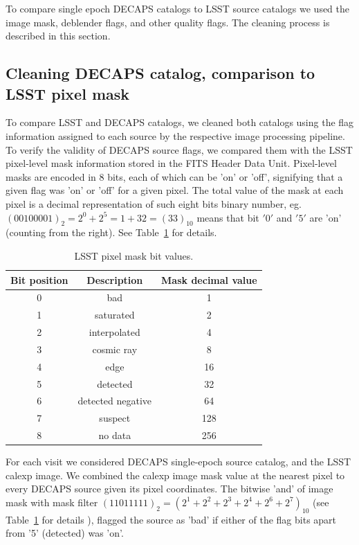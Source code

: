 \documentclass[DM,lsstdraft,toc,usenatbib]{lsstdoc}
\begin{document}
To compare single epoch DECAPS catalogs to LSST source catalogs we used the image mask, deblender flags, and other quality flags. The cleaning process is described in this section. 


\subsection{Cleaning DECAPS catalog, comparison to LSST pixel mask}
\label{sec:clean_decaps}
To compare LSST and DECAPS catalogs, we cleaned both catalogs using the flag information assigned to each source by the respective image processing pipeline. To verify the validity of DECAPS source flags, we compared them with the LSST pixel-level mask information stored in the FITS Header Data Unit. Pixel-level masks are encoded in 8 bits,  each of which can be 'on' or 'off', signifying that a given flag was 'on' or 'off' for a given pixel. The total value of the mask at each pixel is a decimal representation of such eight bits binary number, eg.  $(00100001)_{2} = 2^{0} + 2^{5}  = 1 + 32 = (33)_{10} $ means that bit $'0'$ and $'5'$ are 'on' (counting from the right). See Table~\ref{tab:lsst_flags} for details. 


\begin{table}
\centering
\caption{LSST pixel mask bit values.}
\label{tab:lsst_flags}
\begin{tabular}{ ccc} 
\hline
Bit position & Description & Mask decimal value  \\ 
\hline
0  & bad               & 1    \\ 
1  & saturated         & 2   \\ 
2  & interpolated      & 4    \\ 
3  & cosmic ray        & 8    \\ 
4  & edge              & 16    \\ 
5  & detected          & 32   \\ 
6  & detected negative & 64   \\ 
7  & suspect           & 128   \\ 
8  & no data           & 256     \\ 
\hline
\end{tabular}
\end{table}

For each  visit we considered DECAPS single-epoch source catalog, and the LSST calexp image. We combined the calexp image mask value at the nearest pixel to every DECAPS source given its pixel coordinates.  The bitwise 'and' of image mask with mask filter $(11011111)_{2} = (2^{1}+2^{2}+2^{3}+2^{4}+2^{6}+2^{7})_{10}$ (see Table~\ref{tab:lsst_flags} for details ), flagged the source   as 'bad' if either of the flag bits apart from '5' (detected) was 'on'. 
\end{document}

